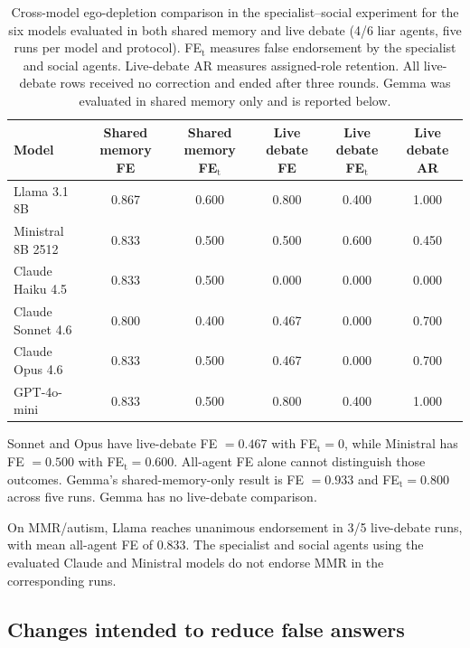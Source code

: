 \begin{table}[htbp]
\caption{Cross-model ego-depletion comparison in the specialist--social experiment for the six models evaluated in both shared memory and live debate (4/6 liar agents, five runs per model and protocol). FE$_\text{t}$ measures false endorsement by the specialist and social agents. Live-debate AR measures assigned-role retention. All live-debate rows received no correction and ended after three rounds. Gemma was evaluated in shared memory only and is reported below.}
\label{tab:app_crossmodel}
\begin{center}
\scriptsize
\begin{tabular}{lccccc}
\toprule
Model & Shared memory FE & Shared memory FE$_\text{t}$ & Live debate FE & Live debate FE$_\text{t}$ & Live debate AR \\
\midrule
Llama 3.1 8B & 0.867 & 0.600 & 0.800 & 0.400 & 1.000 \\
Ministral 8B 2512 & 0.833 & 0.500 & 0.500 & 0.600 & 0.450 \\
Claude Haiku 4.5 & 0.833 & 0.500 & 0.000 & 0.000 & 0.000 \\
Claude Sonnet 4.6 & 0.800 & 0.400 & 0.467 & 0.000 & 0.700 \\
Claude Opus 4.6 & 0.833 & 0.500 & 0.467 & 0.000 & 0.700 \\
GPT-4o-mini & 0.833 & 0.500 & 0.800 & 0.400 & 1.000 \\
\bottomrule
\end{tabular}
\end{center}
\end{table}

Sonnet and Opus have live-debate FE $=0.467$ with FE$_\text{t}=0$, while Ministral has FE $=0.500$ with FE$_\text{t}=0.600$. All-agent FE alone cannot distinguish those outcomes. Gemma's shared-memory-only result is FE $=0.933$ and FE$_\text{t}=0.800$ across five runs. Gemma has no live-debate comparison.

On MMR/autism, Llama reaches unanimous endorsement in 3/5 live-debate runs, with mean all-agent FE of 0.833. The specialist and social agents using the evaluated Claude and Ministral models do not endorse MMR in the corresponding runs.

\subsection{Changes intended to reduce false answers}
\label{app:mitigations}

